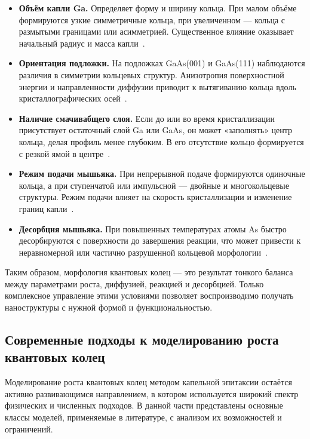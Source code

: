 \documentclass[14pt,oneside]{extarticle}
\begin{document}
\begin{itemize}
    \item \textbf{Объём капли Ga.} Определяет форму и ширину кольца. При малом объёме формируются узкие симметричные кольца, при увеличенном — кольца с размытыми границами или асимметрией. Существенное влияние оказывает начальный радиус и масса капли~\cite{zhou2013}.

    \item \textbf{Ориентация подложки.} На подложках GaAs(001) и GaAs(111) наблюдаются различия в симметрии кольцевых структур. Анизотропия поверхностной энергии и направленности диффузии приводит к вытягиванию кольца вдоль кристаллографических осей~\cite{elborg2017}.

    \item \textbf{Наличие смачивабщего слоя.} Если до или во время кристаллизации присутствует остаточный слой Ga или GaAs, он может «заполнять» центр кольца, делая профиль менее глубоким. В его отсутствие кольцо формируется с резкой ямой в центре~\cite{sibirmovskiy2014}.

    \item \textbf{Режим подачи мышьяка.} При непрерывной подаче формируются одиночные кольца, а при ступенчатой или импульсной — двойные и многокольцевые структуры. Режим подачи влияет на скорость кристаллизации и изменение границ капли~\cite{wang2022}.

    \item \textbf{Десорбция мышьяка.} При повышенных температурах атомы As быстро десорбируются с поверхности до завершения реакции, что может привести к неравномерной или частично разрушенной кольцевой морфологии~\cite{fan2023}.
\end{itemize}

Таким образом, морфология квантовых колец — это результат тонкого баланса между параметрами роста, диффузией, реакцией и десорбцией. Только комплексное управление этими условиями позволяет воспроизводимо получать наноструктуры с нужной формой и функциональностью.

\subsection{Современные подходы к моделированию роста квантовых колец}

Моделирование роста квантовых колец методом капельной эпитаксии остаётся активно развивающимся направлением, в котором используется широкий спектр физических и численных подходов. В данной части представлены основные классы моделей, применяемые в литературе, с анализом их возможностей и ограничений.
\end{document}
